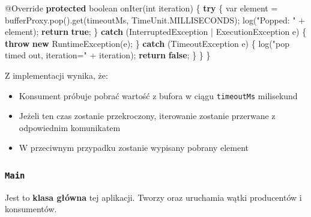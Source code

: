 \documentclass[11pt]{article}
\providecommand{\tightlist}{%
      \setlength{\itemsep}{0pt}\setlength{\parskip}{0pt}}
\newenvironment{Shaded}{}{}
\newcommand{\KeywordTok}[1]{\textcolor[rgb]{0.00,0.44,0.13}{\textbf{{#1}}}}
\newcommand{\DataTypeTok}[1]{\textcolor[rgb]{0.56,0.13,0.00}{{#1}}}
\newcommand{\StringTok}[1]{\textcolor[rgb]{0.25,0.44,0.63}{{#1}}}
\newcommand{\FunctionTok}[1]{\textcolor[rgb]{0.02,0.16,0.49}{{#1}}}
\newcommand{\NormalTok}[1]{{#1}}
\newcommand{\ControlFlowTok}[1]{\textcolor[rgb]{0.00,0.44,0.13}{\textbf{{#1}}}}
\newcommand{\OperatorTok}[1]{\textcolor[rgb]{0.40,0.40,0.40}{{#1}}}
\newcommand{\BuiltInTok}[1]{{#1}}
\newcommand{\AttributeTok}[1]{\textcolor[rgb]{0.49,0.56,0.16}{{#1}}}
\begin{document}
\begin{Shaded}
\begin{Highlighting}[]
    \AttributeTok{@Override}
    \KeywordTok{protected} \DataTypeTok{boolean} \FunctionTok{onIter}\OperatorTok{(}\DataTypeTok{int}\NormalTok{ iteration}\OperatorTok{)} \OperatorTok{\{}
        \ControlFlowTok{try} \OperatorTok{\{}
            \DataTypeTok{var}\NormalTok{ element }\OperatorTok{=}\NormalTok{ bufferProxy}\OperatorTok{.}\FunctionTok{pop}\OperatorTok{().}\FunctionTok{get}\OperatorTok{(}\NormalTok{timeoutMs}\OperatorTok{,} \BuiltInTok{TimeUnit}\OperatorTok{.}\FunctionTok{MILLISECONDS}\OperatorTok{);}
            \FunctionTok{log}\OperatorTok{(}\StringTok{"Popped: "} \OperatorTok{+}\NormalTok{ element}\OperatorTok{);}
            \ControlFlowTok{return} \KeywordTok{true}\OperatorTok{;}
        \OperatorTok{\}} \ControlFlowTok{catch} \OperatorTok{(}\BuiltInTok{InterruptedException} \OperatorTok{|} \BuiltInTok{ExecutionException}\NormalTok{ e}\OperatorTok{)} \OperatorTok{\{}
            \ControlFlowTok{throw} \KeywordTok{new} \BuiltInTok{RuntimeException}\OperatorTok{(}\NormalTok{e}\OperatorTok{);}
        \OperatorTok{\}} \ControlFlowTok{catch} \OperatorTok{(}\BuiltInTok{TimeoutException}\NormalTok{ e}\OperatorTok{)} \OperatorTok{\{}
            \FunctionTok{log}\OperatorTok{(}\StringTok{"pop timed out, iteration="} \OperatorTok{+}\NormalTok{ iteration}\OperatorTok{);}
            \ControlFlowTok{return} \KeywordTok{false}\OperatorTok{;}
        \OperatorTok{\}}
    \OperatorTok{\}}
\OperatorTok{\}}
\end{Highlighting}
\end{Shaded}

Z implementacji wynika, że:

\begin{itemize}
\tightlist
\item
  Konsument próbuje pobrać wartość z bufora w ciągu \texttt{timeoutMs}
  milisekund
\item
  Jeżeli ten czas zostanie przekroczony, iterowanie zostanie przerwane z
  odpowiednim komunikatem
\item
  W przeciwnym przypadku zostanie wypisany pobrany element
\end{itemize}

    \hypertarget{main}{%
\subsubsection{\texorpdfstring{\texttt{Main}}{Main}}\label{main}}

Jest to \textbf{klasa główna} tej aplikacji. Tworzy oraz uruchamia wątki
producentów i konsumentów.
\end{document}
